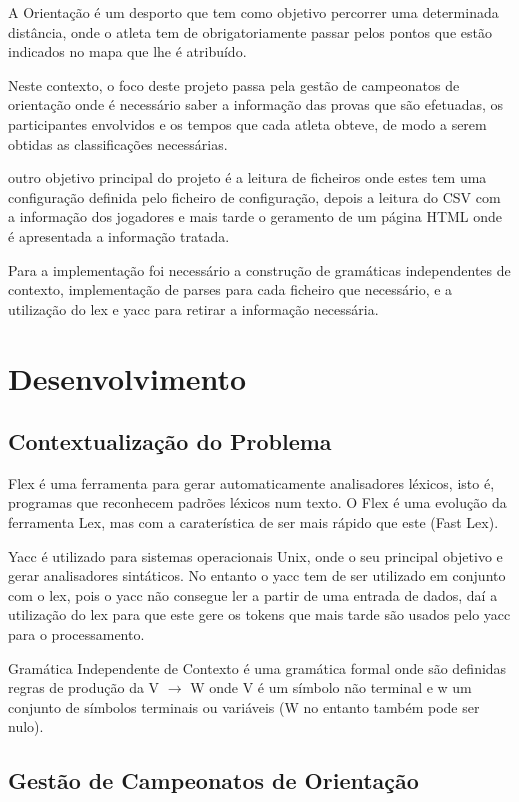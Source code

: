 \documentclass[11pt, a4paper, oneside]{article}
\begin{document}
A Orientação é um desporto que tem como objetivo percorrer uma determinada distância, onde o atleta tem de obrigatoriamente passar pelos pontos que estão indicados no mapa que lhe é atribuído.

Neste contexto, o foco deste projeto passa pela gestão de campeonatos de orientação onde é necessário saber a informação das provas que são efetuadas, os participantes envolvidos e os tempos que cada atleta obteve, de modo a serem obtidas as classificações necessárias.

outro objetivo principal do projeto é a leitura de ficheiros onde estes tem uma configuração definida pelo ficheiro de configuração, depois a leitura do CSV com a informação dos jogadores e mais tarde o geramento de um página HTML onde é apresentada a informação tratada.

Para a implementação foi necessário a construção de gramáticas independentes de contexto, implementação de parses para cada ficheiro que necessário, e a utilização do lex e yacc para retirar a informação necessária.


\newpage
\section{Desenvolvimento}

\subsection{Contextualização do Problema}

Flex é uma ferramenta para gerar automaticamente analisadores léxicos, isto é, programas que reconhecem padrões léxicos num texto. O Flex é uma evolução da ferramenta Lex, mas com a caraterística de ser mais rápido que este (Fast Lex).

Yacc é utilizado para sistemas operacionais Unix, onde o seu principal objetivo e gerar analisadores sintáticos. No entanto o yacc tem de ser utilizado em conjunto com o lex, pois o yacc não consegue ler a partir de uma entrada de dados, daí a utilização  do lex para que este gere os tokens que mais tarde são usados pelo yacc para o processamento.

Gramática Independente de Contexto é uma gramática formal onde são definidas regras de produção da 
 V $\rightarrow$ W onde V é um símbolo não terminal e w um conjunto de símbolos terminais ou variáveis (W no entanto também pode ser nulo).

\subsection{Gestão de Campeonatos de Orientação}
\end{document}
